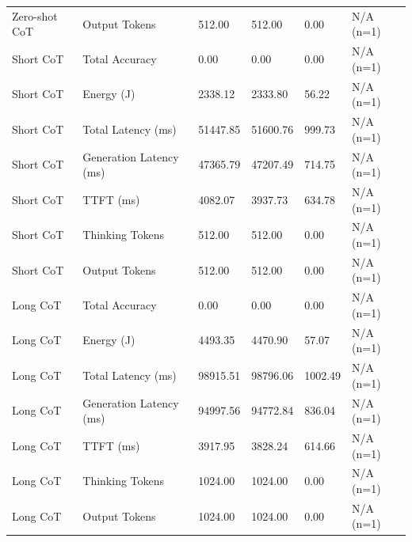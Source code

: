 \begin{table}
\begin{tabular}{llllll}
Zero-shot CoT & Output Tokens & 512.00 & 512.00 & 0.00 & N/A (n=1) \\
Short CoT & Total Accuracy & 0.00 & 0.00 & 0.00 & N/A (n=1) \\
Short CoT & Energy (J) & 2338.12 & 2333.80 & 56.22 & N/A (n=1) \\
Short CoT & Total Latency (ms) & 51447.85 & 51600.76 & 999.73 & N/A (n=1) \\
Short CoT & Generation Latency (ms) & 47365.79 & 47207.49 & 714.75 & N/A (n=1) \\
Short CoT & TTFT (ms) & 4082.07 & 3937.73 & 634.78 & N/A (n=1) \\
Short CoT & Thinking Tokens & 512.00 & 512.00 & 0.00 & N/A (n=1) \\
Short CoT & Output Tokens & 512.00 & 512.00 & 0.00 & N/A (n=1) \\
Long CoT & Total Accuracy & 0.00 & 0.00 & 0.00 & N/A (n=1) \\
Long CoT & Energy (J) & 4493.35 & 4470.90 & 57.07 & N/A (n=1) \\
Long CoT & Total Latency (ms) & 98915.51 & 98796.06 & 1002.49 & N/A (n=1) \\
Long CoT & Generation Latency (ms) & 94997.56 & 94772.84 & 836.04 & N/A (n=1) \\
Long CoT & TTFT (ms) & 3917.95 & 3828.24 & 614.66 & N/A (n=1) \\
Long CoT & Thinking Tokens & 1024.00 & 1024.00 & 0.00 & N/A (n=1) \\
Long CoT & Output Tokens & 1024.00 & 1024.00 & 0.00 & N/A (n=1) \\
\bottomrule
\end{tabular}
\end{table}
